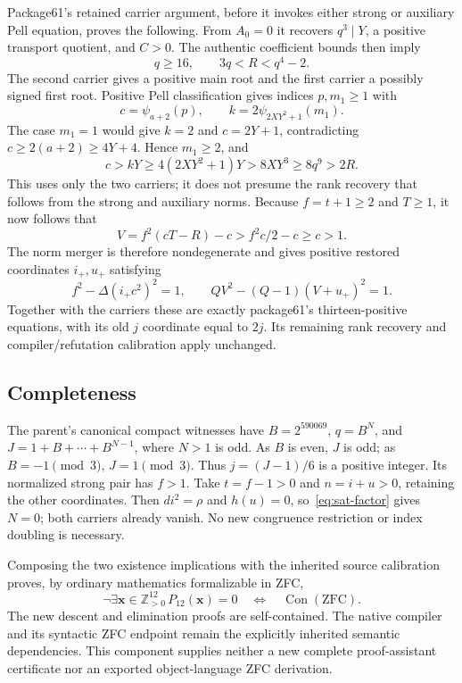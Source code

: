 Package61's retained carrier argument, before it invokes either strong
or auxiliary Pell equation, proves the following.  From $A_0=0$ it
recovers $q^3\mid Y$, a positive transport quotient, and $C>0$.
The authentic coefficient bounds then imply
\[
 q\ge16,\qquad 3q<R<q^4-2.
\]
The second carrier gives a positive main root and the first carrier a
possibly signed first root.  Positive Pell classification gives indices
$p,m_1\ge1$ with
\[
 c=\psi_{a+2}(p),\qquad
 k=2\psi_{2XY^2+1}(m_1).
\]
The case $m_1=1$ would give $k=2$ and $c=2Y+1$, contradicting
$c\ge2(a+2)\ge4Y+4$.  Hence $m_1\ge2$, and
\begin{equation}
 c>kY\ge4(2XY^2+1)Y>8XY^3\ge8q^9>2R.                 \label{eq:sat-bound}
\end{equation}
This uses only the two carriers; it does not presume the rank recovery
that follows from the strong and auxiliary norms.  Because $f=t+1\ge2$
and $T\ge1$, it now follows that
\[
 V=f^2(cT-R)-c>f^2c/2-c\ge c>1.
\]
The norm merger is therefore nondegenerate and gives positive restored
coordinates $i_+,u_+$ satisfying
\[
 f^2-\Delta(i_+c^2)^2=1,
 \qquad QV^2-(Q-1)(V+u_+)^2=1.
\]
Together with the carriers these are exactly package61's thirteen-positive
equations, with its old $j$ coordinate equal to $2j$.  Its remaining rank
recovery and compiler/refutation calibration apply unchanged.

\subsection{Completeness}

The parent's canonical compact witnesses have $B=2^{590069}$,
$q=B^N$, and $J=1+B+\cdots+B^{N-1}$, where $N>1$ is odd.
As $B$ is even, $J$ is odd; as $B=-1\pmod3$, $J=1\pmod3$.
Thus $j=(J-1)/6$ is a positive integer.  Its normalized strong pair has
$f>1$.  Take $t=f-1>0$ and $n=i+u>0$, retaining the other coordinates.
Then $di^2=\rho$ and $h(u)=0$, so~\eqref{eq:sat-factor} gives $N=0$;
both carriers already vanish.  No new congruence restriction or index
doubling is necessary.

Composing the two existence implications with the inherited source
calibration proves, by ordinary mathematics formalizable in ZFC,
\[
 \neg\exists\boldsymbol{x}\in\mathbb Z_{>0}^{12}\,
 P_{12}(\boldsymbol{x})=0
 \quad\Longleftrightarrow\quad \operatorname{Con}(\mathrm{ZFC}).
\]
The new descent and elimination proofs are self-contained.  The native
compiler and its syntactic ZFC endpoint remain the explicitly inherited
semantic dependencies.  This component supplies neither a new complete
proof-assistant certificate nor an exported object-language ZFC derivation.

